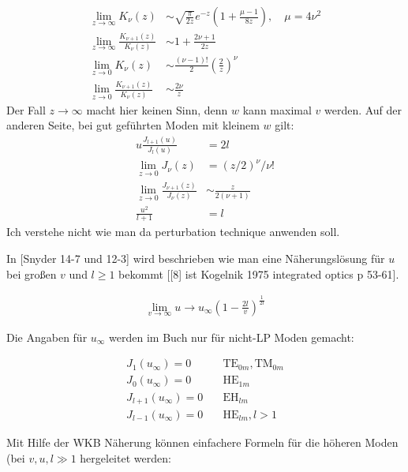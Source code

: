 \documentclass{article}
\def\({\left(}
\def\){\right)}
\begin{document}
\begin{align}
  \lim_{z\rightarrow \infty} K_\nu(z) &\sim \sqrt{\frac{\pi}{2z}} e^{-z}\(1+\frac{\mu-1}{8z}\), \quad \mu=4\nu^2 \\ %
  \lim_{z\rightarrow \infty} \frac{K_{\nu+1}(z)}{K_{\nu}(z)} &\sim 1+\frac{2\nu+1}{2z} \\
  \lim_{z\rightarrow 0} K_\nu(z) &\sim \frac{(\nu-1)!}{2} \(\frac{2}{z}\)^\nu \\ %
  \lim_{z\rightarrow 0     } \frac{K_{\nu+1}(z)}{K_{\nu}(z)} &\sim \frac{2\nu}{z}
\end{align}
Der Fall $z\rightarrow \infty$ macht hier keinen Sinn, denn $w$ kann
maximal $v$ werden.
Auf der anderen Seite, bei gut gef\"uhrten Moden mit kleinem $w$ gilt:
\begin{align}
  u\frac{J_{l+1}(u)}{J_l(u)}&=2l \\
  \lim_{z\rightarrow 0} J_\nu(z) &= (z/2)^\nu/\nu!  \\
    \lim_{z\rightarrow 0} \frac{J_{\nu+1}(z)}{J_{\nu}(z)} &\sim \frac{z}{2(\nu+1)} \\
    \frac{u^2}{l+1} &= l
\end{align}
Ich verstehe nicht wie man da perturbation technique anwenden soll.


In [Snyder 14-7 und 12-3] wird beschrieben wie man eine
N\"aherungsl\"osung f\"ur $u$ bei gro\ss en $v$ und $l\ge 1$ bekommt
[[8] ist Kogelnik 1975 integrated optics p 53-61].

\begin{align}
  \lim_{v\rightarrow\infty }u \rightarrow u_\infty \(1-\frac{2l}{v}\)^\frac{1}{2l}
\end{align}

Die Angaben f\"ur $u_\infty$ werden im Buch nur f\"ur nicht-LP Moden gemacht:

\begin{align}
  J_1(u_\infty) = 0  &\quad \textrm{TE}_{0m}, \textrm{TM}_{0m}\\
  J_0(u_\infty) = 0  &\quad \textrm{HE}_{1m}\\
J_{l+1}(u_\infty) = 0  &\quad \textrm{EH}_{lm}\\
J_{l-1}(u_\infty) = 0  &\quad \textrm{HE}_{lm}, l> 1
\end{align}

Mit Hilfe der WKB N\"aherung k\"onnen einfachere Formeln f\"ur die
h\"oheren Moden (bei $v,u,l\gg 1$ hergeleitet werden:
\end{document}
